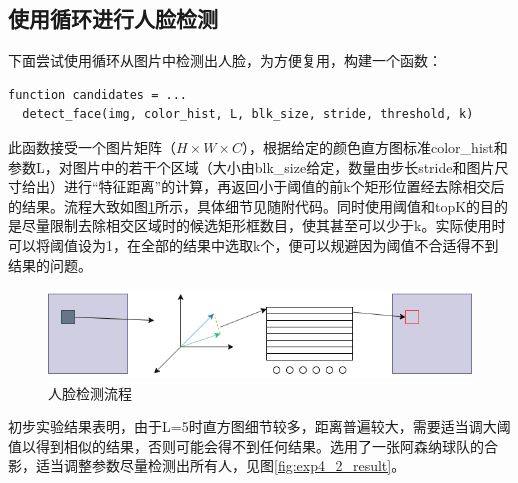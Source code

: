 \documentclass[10pt, a4paper]{article}
\begin{document}
\subsection{使用循环进行人脸检测}

下面尝试使用循环从图片中检测出人脸，为方便复用，构建一个函数：

\begin{verbatim}
function candidates = ...
  detect_face(img, color_hist, L, blk_size, stride, threshold, k)
\end{verbatim}

此函数接受一个图片矩阵（$H \times W \times C$），根据给定的颜色直方图标准color\_hist和参数L，对图片中的若干个区域（大小由blk\_size给定，数量由步长stride和图片尺寸给出）进行“特征距离”的计算，再返回小于阈值的前k个矩形位置经去除相交后的结果。流程大致如图\ref{fig:exp4_2_detect}所示，具体细节见随附代码。同时使用阈值和topK的目的是尽量限制去除相交区域时的候选矩形框数目，使其甚至可以少于k。实际使用时可以将阈值设为1，在全部的结果中选取k个，便可以规避因为阈值不合适得不到结果的问题。

\begin{figure}[h]
    \centering
    \includegraphics[width=.9\textwidth]{"../assets/detect.png"}
    \caption{人脸检测流程}
    \label{fig:exp4_2_detect}
\end{figure}

初步实验结果表明，由于L=5时直方图细节较多，距离普遍较大，需要适当调大阈值以得到相似的结果，否则可能会得不到任何结果。选用了一张阿森纳球队的合影，适当调整参数尽量检测出所有人，见图\ref{fig:exp4_2_result}。
\end{document}
